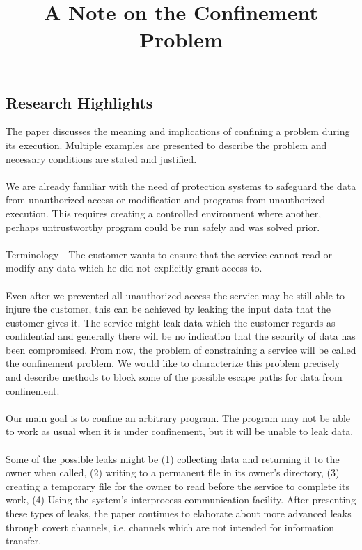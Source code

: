 \subsection{Research Highlights}
\title{A Note on the Confinement Problem}
\maketitle
The paper\cite{lampson1973note} discusses the meaning and implications of confining a problem during its execution.
Multiple examples are presented to describe the problem and necessary conditions are stated and justified.\\\\
We are already familiar with the need of protection systems to safeguard the data from unauthorized access or modification and programs from unauthorized execution. This requires creating a controlled environment where another, perhaps untrustworthy program could be run safely and was solved prior.\\\\
Terminology - The customer wants to ensure that the service cannot read or modify any data which he did not explicitly grant access to.\\\\
Even after we prevented all unauthorized access the service may be still able to injure the customer, this can be achieved by leaking the input data that the customer gives it. The service might leak data which the customer regards as confidential and generally there will be no indication that the security of data has been compromised. From now, the problem of constraining a service will be called the confinement problem. We would like to characterize this problem precisely and describe methods to block some of the possible escape paths for data from confinement.\\\\
Our main goal is to confine an arbitrary program. The program may not be able to work as usual when it is under confinement, but it will be unable to leak data.\\\\
Some of the possible leaks might be (1) collecting data and returning it to the owner when called, (2) writing to a permanent file in its owner’s directory, (3) creating a temporary file for the owner to read before the service to complete its work, (4) Using the system’s interprocess communication facility.
After presenting these types of leaks, the paper continues to elaborate about more advanced leaks through covert channels, i.e. channels which are not intended for information transfer.\\\\
